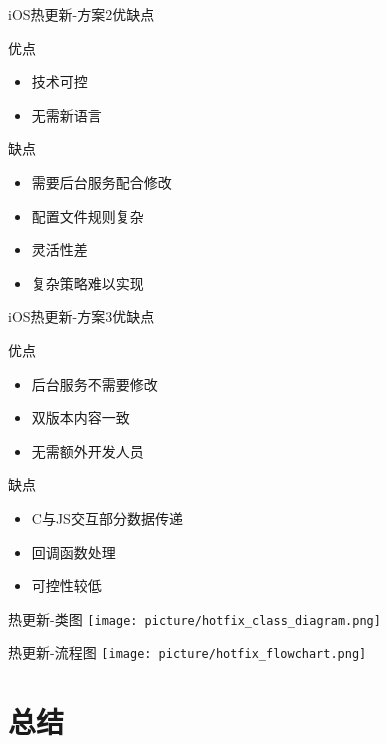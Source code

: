\documentclass[10pt]{beamer}
\begin{document}
\begin{frame}{iOS热更新-方案2优缺点}
	\begin{exampleblock}{优点}
		\begin{itemize}
			\item 技术可控
			\item 无需新语言
		\end{itemize}
	\end{exampleblock}
	\begin{exampleblock}{缺点}
		\begin{itemize}
			\item 需要后台服务配合修改
			\item 配置文件规则复杂
			\item 灵活性差
			\item 复杂策略难以实现
		\end{itemize}
	\end{exampleblock}
\end{frame}

\begin{frame}{iOS热更新-方案3优缺点}
	\begin{exampleblock}{优点}
		\begin{itemize}
			\item 后台服务不需要修改
			\item 双版本内容一致
			\item 无需额外开发人员
		\end{itemize}
	\end{exampleblock}
	\begin{exampleblock}{缺点}
		\begin{itemize}
			\item C与JS交互部分数据传递
			\item 回调函数处理
			\item 可控性较低
		\end{itemize}
	\end{exampleblock}
\end{frame}

\begin{frame}{热更新-类图}
	\texttt{[image: picture/hotfix\_class\_diagram.png]}
\end{frame}

\begin{frame}{热更新-流程图}
	\texttt{[image: picture/hotfix\_flowchart.png]}
\end{frame}

\section{总结}
\end{document}
